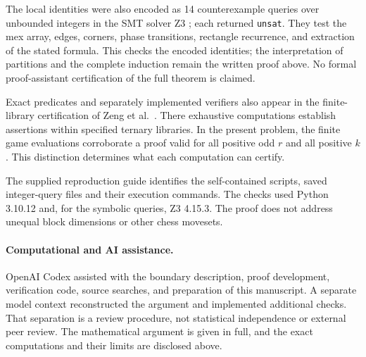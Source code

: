 \documentclass[11pt]{article}
\theoremstyle{remark}
\begin{document}
The local identities were also encoded as 14 counterexample queries
over unbounded integers in the SMT solver Z3 \cite{demoura2008}; each
returned \texttt{unsat}. They test the mex array, edges, corners,
phase transitions, rectangle recurrence, and extraction of the stated
formula. This checks the encoded identities; the interpretation of
partitions and the complete induction remain the written proof above.
No formal proof-assistant certification of the full theorem is claimed.

Exact predicates and separately implemented verifiers also appear in
the finite-library certification of Zeng et al.\ \cite{zeng2026finite}.
There exhaustive computations establish assertions within specified
ternary libraries. In the present problem, the finite game evaluations
corroborate a proof valid for all positive odd $r$ and all positive $k$.
This distinction determines what each computation can certify.

The supplied reproduction guide identifies the self-contained scripts,
saved integer-query files and their execution commands. The checks used
Python 3.10.12 and, for the symbolic queries, Z3 4.15.3. The proof does
not address unequal block dimensions or other chess movesets.

\paragraph{Computational and AI assistance.}
OpenAI Codex assisted with the boundary description, proof development,
verification code, source searches, and preparation of this manuscript.
A separate model context reconstructed the argument and implemented
additional checks. That separation is a review procedure, not statistical
independence or external peer review. The mathematical argument is given
in full, and the exact computations and their limits are disclosed above.



\end{document}
